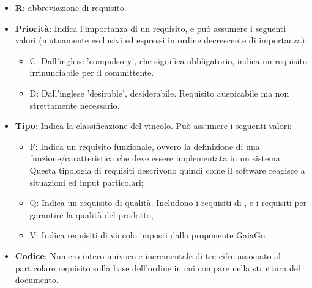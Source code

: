         \begin{itemize}
            \item \textbf{R}: abbreviazione di requisito.
            \item \textbf{Priorità}: Indica l'importanza di un requisito, e può assumere i seguenti valori (mutuamente esclusivi ed espressi in ordine decrescente di importanza):
                \begin{itemize}
                    \item C: Dall'inglese 'compulsory', che significa obbligatorio, indica un requisito irrinunciabile per il committente.
                    \item D: Dall'inglese 'desirable', desiderabile. Requisito auspicabile ma non strettamente necessario.
                   
                    
                \end{itemize}
            \item \textbf{Tipo}: Indica la classificazione del vincolo. Può assumere i seguenti valori:
                \begin{itemize}
                    \item F: Indica un requisito funzionale, ovvero la definizione di una funzione/caratteristica che deve essere implementata in un sistema.  Questa tipologia di requisiti descrivono quindi come il software reagisce a situazioni ed input particolari;
                    \item Q: Indica un requisito di qualità. Includono i requisiti di
                    , 
                     e i requisiti per garantire la qualità del prodotto;
                    \item V: Indica requisiti di vincolo imposti dalla proponente GaiaGo.
                \end{itemize}
            
            \item \textbf{Codice}: Numero intero univoco e incrementale di tre cifre associato al particolare requisito sulla base dell'ordine in cui compare nella struttura del documento.
        \end{itemize}
        
